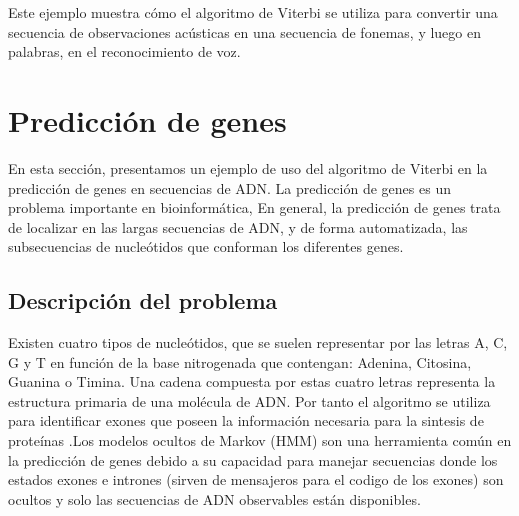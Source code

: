 \documentclass[11pt,openany]{book}
\begin{document}
Este ejemplo muestra cómo el algoritmo de Viterbi se utiliza para convertir una secuencia de observaciones acústicas en una secuencia de fonemas, y luego en palabras, en el reconocimiento de voz.

\section{Predicción de genes}

En esta sección, presentamos un ejemplo de uso del algoritmo de Viterbi en la predicción de genes en secuencias de ADN. La predicción de genes es un problema importante en bioinformática,
En general, la predicción de genes trata de localizar en las largas secuencias de ADN, y de forma automatizada, las subsecuencias de nucleótidos que conforman los diferentes genes.
\subsection*{Descripción del problema}
Existen cuatro tipos de nucleótidos, que se suelen representar por las letras A, C, G y T en función de la base nitrogenada
que contengan: Adenina, Citosina, Guanina o Timina. Una cadena compuesta por estas cuatro letras representa la estructura primaria de una molécula de ADN.
Por tanto el algoritmo se utiliza para identificar exones que poseen la información necesaria para la sintesis 
de proteínas .Los modelos ocultos de Markov (HMM) son una herramienta común en la predicción de genes debido a su capacidad para manejar secuencias donde los estados exones e intrones (sirven de mensajeros para el codigo de los exones) 
son ocultos y solo las secuencias de ADN observables están disponibles. 
\end{document}

